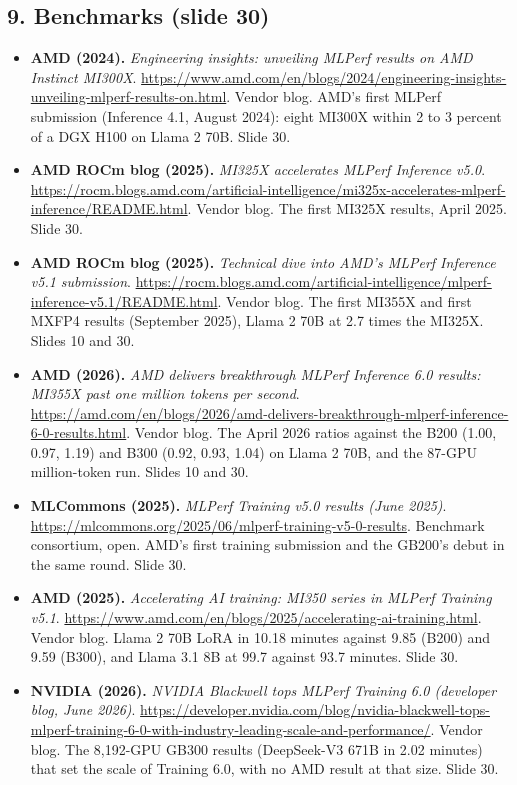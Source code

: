 \documentclass[11pt,letterpaper]{article}
\begin{document}
\subsection*{9. Benchmarks (slide 30)}
\begin{itemize}[leftmargin=1.2em,itemsep=3pt]\sloppy
\item \textbf{AMD (2024).} \textit{Engineering insights: unveiling MLPerf results on AMD Instinct MI300X}. \url{https://www.amd.com/en/blogs/2024/engineering-insights-unveiling-mlperf-results-on.html}. Vendor blog. AMD's first MLPerf submission (Inference 4.1, August 2024): eight MI300X within 2 to 3 percent of a DGX H100 on Llama 2 70B. Slide 30.
\item \textbf{AMD ROCm blog (2025).} \textit{MI325X accelerates MLPerf Inference v5.0}. \url{https://rocm.blogs.amd.com/artificial-intelligence/mi325x-accelerates-mlperf-inference/README.html}. Vendor blog. The first MI325X results, April 2025. Slide 30.
\item \textbf{AMD ROCm blog (2025).} \textit{Technical dive into AMD's MLPerf Inference v5.1 submission}. \url{https://rocm.blogs.amd.com/artificial-intelligence/mlperf-inference-v5.1/README.html}. Vendor blog. The first MI355X and first MXFP4 results (September 2025), Llama 2 70B at 2.7 times the MI325X. Slides 10 and 30.
\item \textbf{AMD (2026).} \textit{AMD delivers breakthrough MLPerf Inference 6.0 results: MI355X past one million tokens per second}. \url{https://amd.com/en/blogs/2026/amd-delivers-breakthrough-mlperf-inference-6-0-results.html}. Vendor blog. The April 2026 ratios against the B200 (1.00, 0.97, 1.19) and B300 (0.92, 0.93, 1.04) on Llama 2 70B, and the 87-GPU million-token run. Slides 10 and 30.
\item \textbf{MLCommons (2025).} \textit{MLPerf Training v5.0 results (June 2025)}. \url{https://mlcommons.org/2025/06/mlperf-training-v5-0-results}. Benchmark consortium, open. AMD's first training submission and the GB200's debut in the same round. Slide 30.
\item \textbf{AMD (2025).} \textit{Accelerating AI training: MI350 series in MLPerf Training v5.1}. \url{https://www.amd.com/en/blogs/2025/accelerating-ai-training.html}. Vendor blog. Llama 2 70B LoRA in 10.18 minutes against 9.85 (B200) and 9.59 (B300), and Llama 3.1 8B at 99.7 against 93.7 minutes. Slide 30.
\item \textbf{NVIDIA (2026).} \textit{NVIDIA Blackwell tops MLPerf Training 6.0 (developer blog, June 2026)}. \url{https://developer.nvidia.com/blog/nvidia-blackwell-tops-mlperf-training-6-0-with-industry-leading-scale-and-performance/}. Vendor blog. The 8,192-GPU GB300 results (DeepSeek-V3 671B in 2.02 minutes) that set the scale of Training 6.0, with no AMD result at that size. Slide 30.
\end{itemize}
\end{document}
